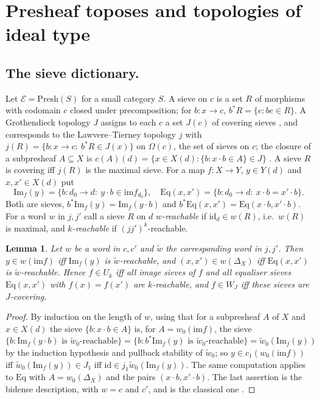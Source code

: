 \documentclass[11pt]{amsart}
\newtheorem{lem}[thm]{Lemma}
\theoremstyle{definition}
\newcommand{\Presh}{\mathrm{Presh}}
\newcommand{\im}{\mathrm{im}}
\newcommand{\Ims}{\mathrm{Im}}
\newcommand{\Eq}{\mathrm{Eq}}
\newcommand{\cE}{\mathcal E}
\begin{document}
\section{Presheaf toposes and topologies of ideal type}\label{sec:ideal}

\subsection*{The sieve dictionary.}
Let $\cE=\Presh(S)$ for a small category $S$. A sieve on $c$ is a set $R$ of
morphisms with codomain $c$ closed under precomposition; for $b\colon x\to c$,
$b^*R=\{e:be\in R\}$. A Grothendieck topology $J$ assigns to each $c$ a set
$J(c)$ of covering sieves \cite[III.2]{MLM}, and corresponds to the
Lawvere--Tierney topology $j$ with $j(R)=\{b\colon x\to c:\ b^*R\in J(x)\}$ on
$\Omega(c)$, the set of sieves on $c$; the closure of a subpresheaf
$A\subseteq X$ is $c(A)(d)=\{x\in X(d):\{b:x\cdot b\in A\}\in J\}$
\cite[V.1, V.4]{MLM}. A sieve $R$ is covering iff $j(R)$ is the maximal sieve.
For a map $f\colon X\to Y$, $y\in Y(d)$ and $x,x'\in X(d)$ put
\[
\Ims_f(y)=\{b\colon d_0\to d:\ y\cdot b\in\im f_{d_0}\},\quad
\Eq(x,x')=\{b\colon d_0\to d:\ x\cdot b=x'\cdot b\}.
\]
Both are sieves, $b^*\Ims_f(y)=\Ims_f(y\cdot b)$ and $b^*\Eq(x,x')=
\Eq(x\cdot b,x'\cdot b)$. For a word $w$ in $j,j'$ call a sieve $R$ on $d$
\emph{$w$-reachable} if $\mathrm{id}_d\in w(R)$, i.e.\ $w(R)$ is maximal, and
\emph{$k$-reachable} if $(jj')^k$-reachable.

\begin{lem}\label{lem:dict}
Let $w$ be a word in $c,c'$ and $\tilde w$ the corresponding word in $j,j'$.
Then $y\in w(\im f)$ iff $\Ims_f(y)$ is $\tilde w$-reachable, and
$(x,x')\in w(\Delta_X)$ iff $\Eq(x,x')$ is $\tilde w$-reachable. Hence
$f\in U_k$ iff all image sieves of $f$ and all equaliser sieves $\Eq(x,x')$
with $f(x)=f(x')$ are $k$-reachable, and $f\in W_J$ iff these sieves are
$J$-covering.
\end{lem}
\begin{proof}
By induction on the length of $w$, using that for a subpresheaf $A$ of $X$
and $x\in X(d)$ the sieve $\{b:x\cdot b\in A\}$ is, for $A=w_0(\im f)$,
the sieve $\{b:\Ims_f(y\cdot b)\text{ is }\tilde w_0\text{-reachable}\}=
\{b:b^*\Ims_f(y)\text{ is }\tilde w_0\text{-reachable}\}=\tilde w_0(\Ims_f(y))$
by the induction hypothesis and pullback stability of $\tilde w_0$; so
$y\in c_1(w_0(\im f))$ iff $\tilde w_0(\Ims_f(y))\in J_1$ iff
$\mathrm{id}\in j_1\tilde w_0(\Ims_f(y))$. The same computation applies to
$\Eq$ with $A=w_0(\Delta_X)$ and the pairs $(x\cdot b,x'\cdot b)$. The last
assertion is the bidense description, with $w=c$ and $c'$, and is the
classical one \cite[III.7, Cor.~6]{MLM}.
\end{proof}
\end{document}
